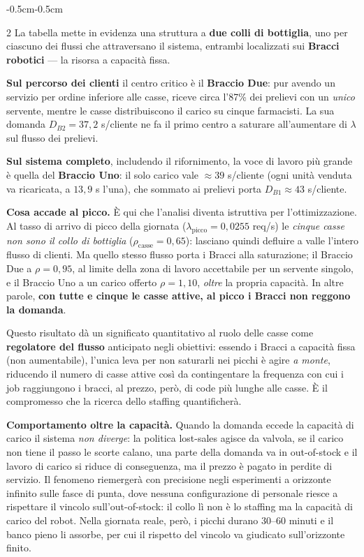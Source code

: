 \documentclass{article}
\begin{document}
\begin{adjustwidth}{-0.5cm}{-0.5cm}
\begin{multicols}{2}
La tabella mette in evidenza una struttura a \textbf{due colli di bottiglia}, uno per ciascuno dei
flussi che attraversano il sistema, entrambi localizzati sui \textbf{Bracci robotici} --- la
risorsa a capacità fissa.

\textbf{Sul percorso dei clienti} il centro critico è il \textbf{Braccio Due}: pur avendo un
servizio per ordine inferiore alle casse, riceve circa l'87\% dei prelievi con un \emph{unico}
servente, mentre le casse distribuiscono il carico su cinque farmacisti. La sua domanda
$D_{B2} = 37{,}2$ s/cliente ne fa il primo centro a saturare all'aumentare di $\lambda$ sul flusso
dei prelievi.

\textbf{Sul sistema completo}, includendo il rifornimento, la voce di lavoro più grande è quella
del \textbf{Braccio Uno}: il solo carico vale $\approx 39$ s/cliente (ogni unità venduta va
ricaricata, a $13{,}9$ s l'una), che sommato ai prelievi porta $D_{B1} \approx 43$ s/cliente.

\textbf{Cosa accade al picco.} È qui che l'analisi diventa istruttiva per l'ottimizzazione. Al tasso
di arrivo di picco della giornata ($\lambda_{\text{picco}} = 0{,}0255$ req/s) le \emph{cinque casse
non sono il collo di bottiglia} ($\rho_{\text{casse}} = 0{,}65$): lasciano quindi defluire a valle
l'intero flusso di clienti. Ma quello stesso flusso porta i Bracci alla saturazione; il Braccio
Due a $\rho = 0{,}95$, al limite della zona di lavoro accettabile per un servente singolo, e il
Braccio Uno a un carico offerto $\rho = 1{,}10$, \emph{oltre} la propria capacità. In altre parole,
\textbf{con tutte e cinque le casse attive, al picco i Bracci non reggono la domanda}.

Questo risultato dà un significato quantitativo al ruolo delle casse come \textbf{regolatore del
flusso} anticipato negli obiettivi: essendo i Bracci a capacità fissa (non aumentabile), l'unica
leva per non saturarli nei picchi è agire \emph{a monte}, riducendo il numero di casse attive così
da contingentare la frequenza con cui i job raggiungono i bracci, al prezzo, però, di code più
lunghe alle casse. È il compromesso che la ricerca dello staffing quantificherà.

\textbf{Comportamento oltre la capacità.} Quando la domanda eccede la capacità di carico il sistema
\emph{non diverge}: la politica lost-sales agisce da valvola, se il carico non tiene il passo le
scorte calano, una parte della domanda va in out-of-stock e il lavoro di carico si riduce di
conseguenza, ma il prezzo è pagato in perdite di servizio. Il fenomeno riemergerà con precisione
negli esperimenti a orizzonte infinito sulle fasce di punta, dove nessuna
configurazione di personale riesce a rispettare il vincolo sull'out-of-stock: il collo lì non è lo
staffing ma la capacità di carico del robot. Nella giornata reale, però, i picchi durano 30--60
minuti e il banco pieno li assorbe, per cui il rispetto del vincolo va giudicato sull'orizzonte
finito.


\end{multicols}
\end{adjustwidth}
\end{document}
